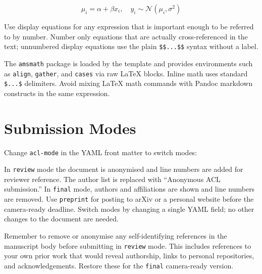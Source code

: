 \documentclass[11pt]{article}
\begin{document}
\[
\mu_i = \alpha + \beta x_i, \quad y_i \sim \mathcal{N}(\mu_i, \sigma^2)
\]

Use display equations for any expression that is important enough to be
referred to by number. Number only equations that are actually
cross-referenced in the text; unnumbered display equations use the plain
\texttt{\$\$...\$\$} syntax without a label.

The \texttt{amsmath} package is loaded by the template and provides
environments such as \texttt{align}, \texttt{gather}, and \texttt{cases}
via raw LaTeX blocks. Inline math uses standard \texttt{\$...\$}
delimiters. Avoid mixing LaTeX math commands with Pandoc markdown
constructs in the same expression.

\section{Submission Modes}\label{submission-modes}

Change \texttt{acl-mode} in the YAML front matter to switch modes:

\begin{table}


\caption{\label{tbl-modes}ACL submission modes.}

\end{table}%

In \texttt{review} mode the document is anonymised and line numbers are
added for reviewer reference. The author list is replaced with
``Anonymous ACL submission.'' In \texttt{final} mode, authors and
affiliations are shown and line numbers are removed. Use
\texttt{preprint} for posting to arXiv or a personal website before the
camera-ready deadline. Switch modes by changing a single YAML field; no
other changes to the document are needed.

Remember to remove or anonymise any self-identifying references in the
manuscript body before submitting in \texttt{review} mode. This includes
references to your own prior work that would reveal authorship, links to
personal repositories, and acknowledgements. Restore these for the
\texttt{final} camera-ready version.


\end{document}
